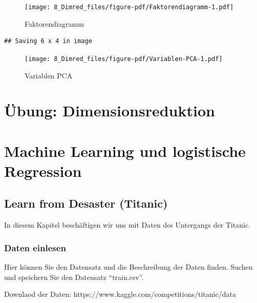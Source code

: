 \documentclass[
  10pt,
  letterpaper,
  a4paper, twoside]{scrreprt}
\begin{document}
\begin{figure}[H]

{\centering \texttt{[image: 8\_Dimred\_files/figure-pdf/Faktorendiagramm-1.pdf]}

}

\caption{Faktorendiagramm}

\end{figure}%

\begin{verbatim}
## Saving 6 x 4 in image
\end{verbatim}

\begin{figure}[H]

{\centering \texttt{[image: 8\_Dimred\_files/figure-pdf/Variablen-PCA-1.pdf]}

}

\caption{Variablen PCA}

\end{figure}%


\chapter{Übung: Dimensionsreduktion}\label{uxfcbung-dimensionsreduktion}


\chapter{Machine Learning und logistische
Regression}\label{machine-learning-und-logistische-regression}

\section{Learn from Desaster
(Titanic)}\label{learn-from-desaster-titanic}

In diesem Kapitel beschäftigen wir uns mit Daten des Untergangs der
Titanic.

\subsection{Daten einlesen}\label{daten-einlesen}

Hier können Sie den Datensatz und die Beschreibung der Daten finden.
Suchen und speichern Sie den Datensatz \enquote{train.csv}.

Downlaod der Daten: https://www.kaggle.com/competitions/titanic/data
\end{document}

